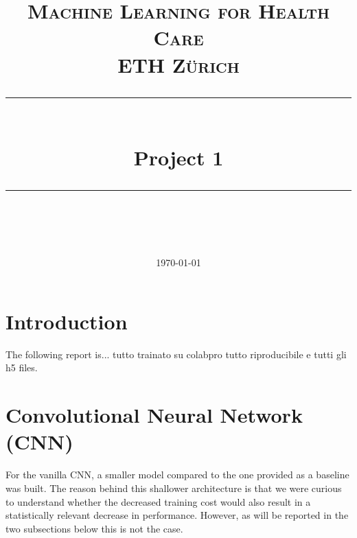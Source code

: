 \documentclass[11pt]{scrartcl}
\title{	
	\normalfont\normalsize
	\textsc{Machine Learning for Health Care\\%
	ETH Zürich}\\
	\vspace{25pt}
	\rule{\linewidth}{0.5pt}\\
	\vspace{20pt}
	{\huge Project 1}\\
	\vspace{12pt}
	\rule{\linewidth}{1pt}\\
	\vspace{12pt}
}
\author{\LARGE \thestudent}
\date{\normalsize\today}
\begin{document}
\maketitle
\newpage

\section{Introduction}
The following report is... tutto trainato su colabpro tutto riproducibile e tutti gli h5 files.

\section{Convolutional Neural Network (CNN)}
For the vanilla CNN, a smaller model compared to the one provided as a baseline was built. The reason behind this shallower architecture is that we were curious to understand whether the decreased training cost would also result in a statistically relevant decrease in performance. However, as will be reported in the two subsections below this is not the case. 

\end{document}
